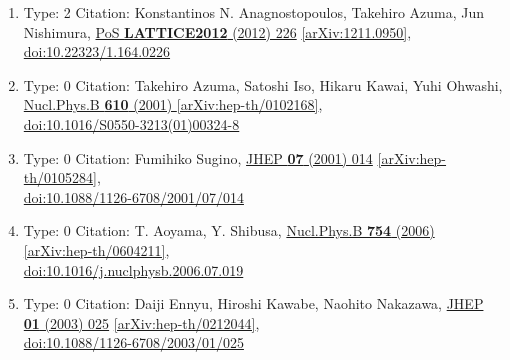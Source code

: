 \documentclass[a4paper,10pt]{article}
\begin{document}
\begin{enumerate}
\begin{enumerate}
  \item Type: 2 Citation: Konstantinos N. Anagnostopoulos, Takehiro Azuma, Jun Nishimura, \href{https://www.doi.org/10.22323/1.164.0226}{PoS {\bf LATTICE2012} (2012) 226}  \href{https://arxiv.org/abs/1211.0950}{[arXiv:1211.0950]},\\\href{https://www.doi.org/10.22323/1.164.0226}{doi:10.22323/1.164.0226}
  \item Type: 0 Citation: Takehiro Azuma, Satoshi Iso, Hikaru Kawai, Yuhi Ohwashi, \href{https://www.doi.org/10.1016/S0550-3213(01)00324-8}{Nucl.Phys.B {\bf 610} (2001) }  \href{https://arxiv.org/abs/hep-th/0102168}{[arXiv:hep-th/0102168]},\\\href{https://www.doi.org/10.1016/S0550-3213(01)00324-8}{doi:10.1016/S0550-3213(01)00324-8}
  \item Type: 0 Citation: Fumihiko Sugino, \href{https://www.doi.org/10.1088/1126-6708/2001/07/014}{JHEP {\bf 07} (2001) 014}  \href{https://arxiv.org/abs/hep-th/0105284}{[arXiv:hep-th/0105284]},\\\href{https://www.doi.org/10.1088/1126-6708/2001/07/014}{doi:10.1088/1126-6708/2001/07/014}
  \item Type: 0 Citation: T. Aoyama, Y. Shibusa, \href{https://www.doi.org/10.1016/j.nuclphysb.2006.07.019}{Nucl.Phys.B {\bf 754} (2006) }  \href{https://arxiv.org/abs/hep-th/0604211}{[arXiv:hep-th/0604211]},\\\href{https://www.doi.org/10.1016/j.nuclphysb.2006.07.019}{doi:10.1016/j.nuclphysb.2006.07.019}
  \item Type: 0 Citation: Daiji Ennyu, Hiroshi Kawabe, Naohito Nakazawa, \href{https://www.doi.org/10.1088/1126-6708/2003/01/025}{JHEP {\bf 01} (2003) 025}  \href{https://arxiv.org/abs/hep-th/0212044}{[arXiv:hep-th/0212044]},\\\href{https://www.doi.org/10.1088/1126-6708/2003/01/025}{doi:10.1088/1126-6708/2003/01/025}

\end{enumerate}
\end{enumerate}
\end{document}

